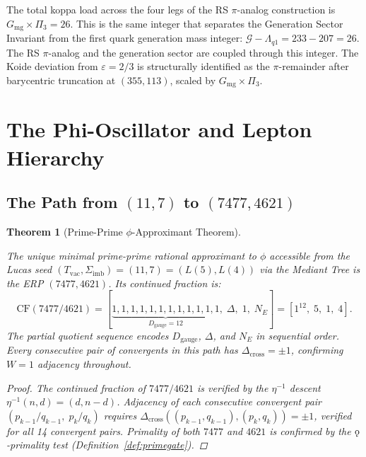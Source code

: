 \documentclass[11pt, letterpaper]{article}
\newcommand{\aop}{\eta}
\newcommand{\Dcross}{\Delta_{\mathrm{cross}}}
\newcommand{\koppa}{\mathbin{\text{\rm\k{o}}}}
\newcommand{\Dg}{D_{\mathrm{gauge}}}
\newcommand{\Sigimb}{\Sigma_{\mathrm{imb}}}
\newcommand{\Gmg}{G_{\mathrm{mg}}}
\newcommand{\Pithree}{\Pi_3}
\theoremstyle{definition}
\theoremstyle{plain}
\newtheorem{theorem}{Theorem}[section]
\begin{document}
\begin{observebox}
The total koppa load across the four legs of the RS $\pi$-analog construction
is $\Gmg\times\Pithree=26$.  This is the same integer that separates the
Generation Sector Invariant from the first quark generation mass integer:
$\mathcal{G}-\Lambda_{q1}=233-207=26$.  The RS $\pi$-analog and the
generation sector are coupled through this integer.  The Koide deviation from
$\varepsilon=2/3$ is structurally identified as the $\pi$-remainder after
barycentric truncation at $(355,113)$, scaled by $\Gmg\times\Pithree$.
\end{observebox}

\newpage


\section{The Phi-Oscillator and Lepton Hierarchy}\label{sec:phi-oscillator}

\subsection{The Path from $(11,7)$ to $(7477,4621)$}

\begin{theorem}[Prime-Prime $\phi$-Approximant Theorem]\label{thm:phi-prime}
\begin{rsbox}
The unique minimal prime-prime rational approximant to $\phi$ accessible from
the Lucas seed $(T_{\mathrm{vac}},\Sigimb)=(11,7)=(L(5),L(4))$ via the
Mediant Tree is the ERP $(7477,4621)$.  Its continued fraction is:
\[
\mathrm{CF}(7477/4621)
= [\underbrace{1,1,1,1,1,1,1,1,1,1,1,1}_{\Dg=12},\;\Delta,\;1,\;N_E]
= [1^{12},\;5,\;1,\;4].
\]
The partial quotient sequence encodes $\Dg$, $\Delta$, and $N_E$ in
sequential order.  Every consecutive pair of convergents in this path has
$\Dcross=\pm 1$, confirming $W=1$ adjacency throughout.
\end{rsbox}
\begin{proof}
The continued fraction of $7477/4621$ is verified by the $\aop^{-1}$
descent $\aop^{-1}(n,d)=(d,n-d)$.  Adjacency of each consecutive convergent
pair $(p_{k-1}/q_{k-1},\;p_k/q_k)$ requires
$\Dcross((p_{k-1},q_{k-1}),(p_k,q_k))=\pm 1$, verified for all 14 convergent
pairs.  Primality of both $7477$ and $4621$ is confirmed by the
$\koppa$-primality test (Definition~\ref{def:primegate}).
\end{proof}
\end{theorem}
\end{document}
